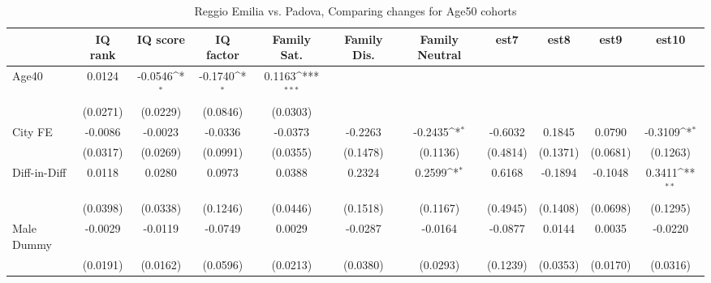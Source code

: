 \begin{table}[htbp]\centering
\def\sym#1{\ifmmode^{#1}\else\(^{#1}\)\fi}
\caption{Reggio Emilia vs. Padova, Comparing changes for Age50 cohorts}
\begin{tabular}{l*{10}{c}}
\toprule
            &\multicolumn{1}{c}{IQ rank}&\multicolumn{1}{c}{IQ score}&\multicolumn{1}{c}{IQ factor}&\multicolumn{1}{c}{Family Sat.}&\multicolumn{1}{c}{Family Dis.}&\multicolumn{1}{c}{Family Neutral}&\multicolumn{1}{c}{est7}&\multicolumn{1}{c}{est8}&\multicolumn{1}{c}{est9}&\multicolumn{1}{c}{est10}\\
\midrule
Age40       &      0.0124         &     -0.0546\sym{*}  &     -0.1740\sym{*}  &      0.1163\sym{***}&                     &                     &                     &                     &                     &                     \\
            &    (0.0271)         &    (0.0229)         &    (0.0846)         &    (0.0303)         &                     &                     &                     &                     &                     &                     \\
\addlinespace
City FE     &     -0.0086         &     -0.0023         &     -0.0336         &     -0.0373         &     -0.2263         &     -0.2435\sym{*}  &     -0.6032         &      0.1845         &      0.0790         &     -0.3109\sym{*}  \\
            &    (0.0317)         &    (0.0269)         &    (0.0991)         &    (0.0355)         &    (0.1478)         &    (0.1136)         &    (0.4814)         &    (0.1371)         &    (0.0681)         &    (0.1263)         \\
\addlinespace
Diff-in-Diff&      0.0118         &      0.0280         &      0.0973         &      0.0388         &      0.2324         &      0.2599\sym{*}  &      0.6168         &     -0.1894         &     -0.1048         &      0.3411\sym{**} \\
            &    (0.0398)         &    (0.0338)         &    (0.1246)         &    (0.0446)         &    (0.1518)         &    (0.1167)         &    (0.4945)         &    (0.1408)         &    (0.0698)         &    (0.1295)         \\
\addlinespace
Male Dummy  &     -0.0029         &     -0.0119         &     -0.0749         &      0.0029         &     -0.0287         &     -0.0164         &     -0.0877         &      0.0144         &      0.0035         &     -0.0220         \\
            &    (0.0191)         &    (0.0162)         &    (0.0596)         &    (0.0213)         &    (0.0380)         &    (0.0293)         &    (0.1239)         &    (0.0353)         &    (0.0170)         &    (0.0316)         \\

\end{tabular}
\end{table}
